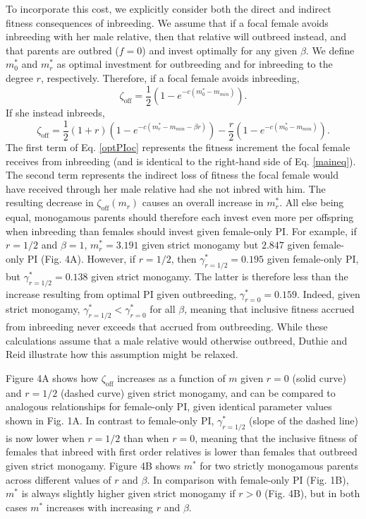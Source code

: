 \documentclass[12pt]{article}
\begin{document}
To incorporate this cost, we explicitly consider both the direct and indirect fitness consequences of inbreeding. We assume that if a focal female avoids inbreeding with her male relative, then that relative will outbreed instead, and that parents are outbred ($f=0$) and invest optimally for any given $\beta$. We define $m^{*}_{0}$ and $m^{*}_{r}$ as optimal investment for outbreeding and for inbreeding to the degree $r$, respectively. Therefore, if a focal female avoids inbreeding,
\begin{equation} \label{optPI}
\zeta_{\textrm{off}} = \frac{1}{2}\left(1-e^{-c\left(m^{*}_{0}-m_{min}\right)}\right).
\end{equation}
If she instead inbreeds,
\begin{equation} \label{optPIoc}
\zeta_{\textrm{off}} = \frac{1}{2}\left(1+r\right)\left(1-e^{-c\left(m^{*}_{r}-m_{min}-\beta r\right)}\right) - \frac{r}{2}\left(1-e^{-c\left(m^{*}_{0}-m_{min}\right)}\right).
\end{equation} 
The first term of Eq. \ref{optPIoc} represents the fitness increment the focal female receives from inbreeding (and is identical to the right-hand side of Eq. \ref{maineq}). The second term represents the indirect loss of fitness the focal female would have received through her male relative had she not inbred with him. The resulting decrease in $\zeta_{\textrm{off}}(m_{r})$ causes an overall increase in $m^{*}_{r}$. All else being equal, monogamous parents should therefore each invest even more per offspring when inbreeding than females should invest given female-only PI. For example, if $r=1/2$ and $\beta=1$, $m^{*}_{r}= 3.191$ given strict monogamy but $2.847$ given female-only PI (Fig. 4A). However, if $r=1/2$, then $\gamma^{*}_{r=1/2}=0.195$ given female-only PI, but $\gamma^{*}_{r=1/2}=0.138$ given strict monogamy. The latter is therefore less than the increase resulting from optimal PI given outbreeding, $\gamma^{*}_{r=0}=0.159$. Indeed, given strict monogamy, $\gamma^{*}_{r=1/2} < \gamma^{*}_{r=0}$ for all $\beta$, meaning that inclusive fitness accrued from inbreeding never exceeds that accrued from outbreeding.  While these calculations assume that a male relative would otherwise outbreed, Duthie and Reid \cite{Duthie2015a} illustrate how this assumption might be relaxed.

Figure 4A shows how $\zeta_{\textrm{off}}$ increases as a function of $m$ given $r=0$ (solid curve) and $r=1/2$ (dashed curve) given strict monogamy, and can be compared to analogous relationships for female-only PI, given identical parameter values shown in Fig. 1A. In contrast to female-only PI, $\gamma^{*}_{r=1/2}$ (slope of the dashed line) is now lower when $r=1/2$ than when $r=0$, meaning that the inclusive fitness of females that inbreed with first order relatives is lower than females that outbreed given strict monogamy. Figure 4B shows $m^{*}$ for two strictly monogamous parents across different values of $r$ and $\beta$. In comparison with female-only PI (Fig. 1B), $m^{*}$ is always slightly higher given strict monogamy if $r>0$ (Fig. 4B), but in both cases $m^{*}$ increases with increasing $r$ and $\beta$. 
\end{document}
